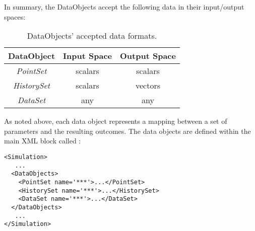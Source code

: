 In summary, the DataObjects accept the following data in their input/output spaces:
\begin{table}[h]
\centering
\caption{DataObjects' accepted data formats.}
\label{DataObjectDataFormatTable}
\begin{tabular}{|c|c|c|}
\hline
\textbf{DataObject}                        & \textbf{Input Space} & \textbf{Output Space} \\ \hline
{\color[HTML]{FE0000} \textit{PointSet}}   & scalars              & scalars               \\ \hline
{\color[HTML]{FE0000} \textit{HistorySet}} & scalars              & vectors               \\ \hline
{\color[HTML]{FE0000} \textit{DataSet}}    & any                  & any                   \\ \hline
\end{tabular}
\end{table}


As noted above, each data object represents a mapping between a set of
parameters and the resulting outcomes.
%
The data objects are defined within the main XML block called :
\begin{lstlisting}[style=XML]
<Simulation>
   ...
  <DataObjects>
    <PointSet name='***'>...</PointSet>
    <HistorySet name='***'>...</HistorySet>
    <DataSet name='***'>...</DataSet>
  </DataObjects>
   ...
</Simulation>
\end{lstlisting}

